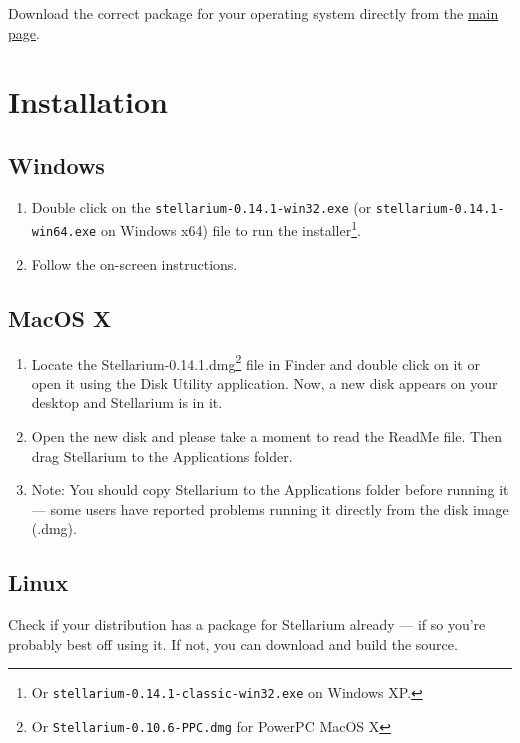 Download the correct package for your operating system directly from the
\href{http://stellarium.org}{main page}.

\section{Installation}\label{installation}

\subsection{Windows}\label{windows}

\begin{enumerate}
\item
  Double click on the \texttt{stellarium-0.14.1-win32.exe} (or
  \texttt{stellarium-0.14.1-win64.exe} on Windows x64) file to run the
  installer\footnote{Or \texttt{stellarium-0.14.1-classic-win32.exe} on
    Windows XP.}.
\item
  Follow the on-screen instructions.
\end{enumerate}

\subsection{MacOS X}\label{macos-x}

\begin{enumerate}
\item
  Locate the Stellarium-0.14.1.dmg\footnote{Or
    \texttt{Stellarium-0.10.6-PPC.dmg} for PowerPC MacOS X} file in
  Finder and double click on it or open it using the Disk Utility
  application. Now, a new disk appears on your desktop and Stellarium is
  in it.
\item
  Open the new disk and please take a moment to read the ReadMe file.
  Then drag Stellarium to the Applications folder.
\item
  Note: You should copy Stellarium to the Applications folder before
  running it --- some users have reported problems running it directly
  from the disk image (.dmg).
\end{enumerate}

\subsection{Linux}\label{linux}

Check if your distribution has a package for Stellarium already --- if
so you're probably best off using it. If not, you can download and build
the source.

